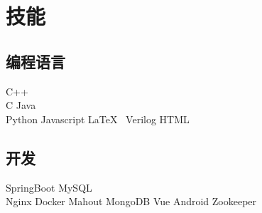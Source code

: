 \documentclass[]{deedy-resume-openfont}
\begin{document}
\begin{minipage}[t]{0.25\textwidth}

\section{技能}
\sectionsep
\subsection{编程语言}
C++ \\
C \textbullet{} Java \\
Python \textbullet{} Javascript \textbullet{} \LaTeX\ \textbullet{} Verilog \textbullet{} HTML \\ 
\sectionsep

\subsection{开发}
SpringBoot  \textbullet{} MySQL \\
Nginx \textbullet{} Docker \textbullet{} Mahout \textbullet{} MongoDB \textbullet{} Vue \textbullet{} Android \textbullet{} Zookeeper \\
\sectionsep


%
%

\end{minipage} 
\hfill
\end{document}
